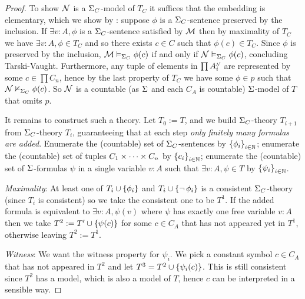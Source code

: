 \begin{proof}
    To show $\mathcal{N}$ is a $\Sigma_C$-model of $T_C$ it suffices that the 
    embedding is elementary, which we show by 
    :
    suppose $\phi$ is a $\Sigma_C$-sentence preserved by the inclusion.
    If $\exists v : A, \phi$ is a $\Sigma_C$-sentence satisfied by $\mathcal{M}$ then 
    by maximality of $T_C$ we have $\exists v : A, \phi \in T_C$ and so there 
    exists $c \in C$ such that $\phi(c) \in T_C$.
    Since $\phi$ is preserved by the inclusion, 
    $\mathcal{M} \vDash_{\Sigma_C} \phi(c)$ if and only if $\mathcal{N} \vDash_{\Sigma_C} \phi(c)$,
    concluding Tarski-Vaught.
    Furthermore, any tuple of elements in $\prod \nnintp{A_i}$ 
    are represented by some $c \in \prod C_n$, 
    hence by the last property of $T_C$
    we have some $\phi \in p$ such that $\mathcal{N} \nvDash_{\Sigma_C} \phi(c)$. 
    So $\mathcal{N}$ is a countable (as $\Sigma$ and each $C_A$ is countable) 
    $\Sigma$-model of $T$ that omits $p$.

    It remains to construct such a theory.
    Let $T_0 := T$, and we build $\Sigma_C$-theory $T_{i+1}$
    from $\Sigma_C$-theory $T_i$,
    guaranteeing that at each step 
    \textit{only finitely many formulas are added}.
    Enumerate the (countable) set of $\Sigma_C$-sentences by 
    $\left\{\phi_i\right\}_{i \in \mathbb{N}}$;
    enumerate the (countable) set of tuples $C_1 \times \dots \times C_n$ 
    by $\left\{c_i\right\}_{i \in \mathbb{N}}$;
    enumerate the (countable) set of $\Sigma$-formulas $\psi$ in a single variable 
    $v : A$ such that $\exists v : A, \psi \in T$ by $\left\{\psi_i\right\}_{i \in \mathbb{N}}$.

    \textit{Maximality}:
    At least one of $T_i \cup \left\{\phi_i\right\}$ and $T_i \cup \left\{\neg\, \phi_i\right\}$ 
    is a consistent $\Sigma_C$-theory
    (since $T_i$ is consistent)
    so we take the consistent one to be $T^1$.
    If the added formula is equivalent to $\exists v : A, \psi(v)$ 
    where $\psi$ has exactly one
    free variable $v : A$ then we take $T^2 := T' \cup \left\{\psi(c)\right\}$ 
    for some $c \in C_A$ that has not appeared yet in $T^1$,
    otherwise leaving $T^2 := T^1$.  

    \textit{Witness}: We want the witness property for $\psi_i$.
    We pick a constant symbol $c \in C_A$ that has not appeared in 
    $T^2$ and let $T^3 = T^2 \cup \left\{\psi_i(c)\right\}$. 
    This is still consistent since $T^2$ has a model, which is also a model of 
    $T$, hence $c$ can be interpreted in a sensible way.
    

\end{proof}
